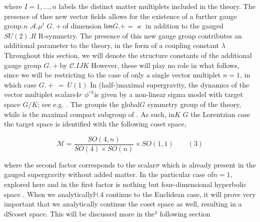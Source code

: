 \documentclass{article}
\begin{document}
where $I = 1, \dots, n$ labels the distinct matter multiplets included in the theory. The presence
of thee new vector fields  allows for the existence of a further gauge group$. { n }$ $\mathcal { A } . { \mu } ^ { t }$ $G . { + }$of dimension
$\mathsf { l i m } G . { + } = \varkappa$ in addition to the gauged $S U ( 2 ) . { R }$ R-symmetry. The presence of this new gauge
group contributes an additional parameter to the theory, in the form of a coupling constant
$\lambda$ Throughout this section, we will denote the structure constants of the additional gauge
group $G . { + }$by $\mathcal { C } . { I J K }$ However, these will play no role in what follows, since we will be
restricting to the case of only a single vector multiplet $n = 1$, in which case $G . { + } ~ = ~ U ( 1 )$
In (half-)maximal supergravity, the dynamics of the  vector multiplet scalars$4 r$ $\phi ^ { \cap t }$is given
by a non-linear sigma model with target space $G / K$; see e.g. . The groupis the global$G$
symmetry group of the theory, while  is the maximal compact subgroup of  . As such, in$K$ $G$
the Lorentzian case the target space is identified with the following coset space,


\begin{equation}
\mathcal { M } = \frac { S O ( 4, n ) } { S O ( 4 ) \times S O ( n ) } \times S O ( 1, 1 ) \qquad ( 3 )
\end{equation}


where the second factor corresponds to the scalar$\sigma$ which is already present in the gauged
supergravity without added matter. In the particular case of$n = 1$, explored here and in
the first factor is nothing but four-dimensional hyperbolic space  . When we analytically$\mathbb { H } . { 4 }$
continue to the Euclidean case, it will prove very important that we analytically continue
the coset space as well, resulting in a dScoset space. This will be discussed more in the$^ 4$
following section
\end{document}
